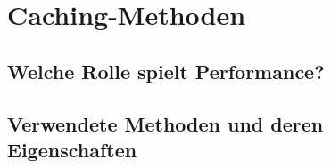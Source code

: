 \section{Caching-Methoden}
\label{s:cachingmethoden}

\subsection{Welche Rolle spielt Performance?}
\label{ss:rolleperformance}

\subsection{Verwendete Methoden und deren Eigenschaften}
\label{ss:methodeneigenschaften}



















